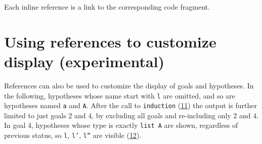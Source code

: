 \documentclass[a4paper]{article}
\begin{document}
Each inline reference is a link to the corresponding code fragment.


\section{Using references to customize display (\textbf{experimental})%
  \label{using-references-to-customize-display-experimental}%
}

References can also be used to customize the display of goals and hypotheses.  In the following, hypotheses whose name start with \texttt{l} are omitted, and so are hypotheses named \texttt{a} and \texttt{A}.  After the call to \texttt{induction} (\hyperref[references-rst-io-pr-s-induction-1-0]{11}) the output is further limited to just goals 2 and 4, by excluding all goals and re-including only 2 and 4.  In goal 4, hypotheses whose type is exactly \texttt{list A} are shown, regardless of previous status, so \texttt{l}, \texttt{l'}, \texttt{l''} are visible (\hyperref[references-rst-io-pr-s-induction-1-g-4-h-l-0]{12}).
\end{document}
